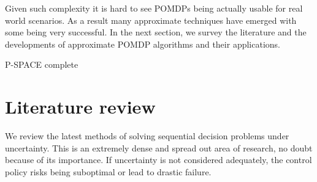 Given such complexity it is hard to see POMDPs being actually usable for real world scenarios. As a result many approximate 
techniques have emerged with some being very successful. In the next section, we survey the literature 
and the developments of approximate POMDP algorithms and their applications.

P-SPACE \cite{psace_mdp_1987} complete






\section{Literature review}\label{sec:lit_rev}

We review the latest methods of solving sequential decision problems under uncertainty. 
This is an extremely dense and spread out area of research, no doubt because of its 
importance. If uncertainty is not considered adequately, the control policy 
risks being suboptimal or lead to drastic failure. 

